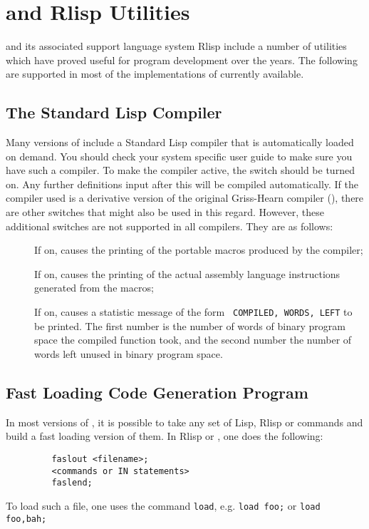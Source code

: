 \chapter{{\REDUCE} and Rlisp Utilities}

{\REDUCE} and its associated support language system Rlisp
include a number of utilities which have proved useful for program
development over the years.  The following are supported in most of the
implementations of {\REDUCE} currently available.

\section{The Standard Lisp Compiler}
\hypertarget{switch:COMP}{}

Many versions of {\REDUCE} include a Standard Lisp compiler that is
automatically loaded on demand.  You should check your system specific
user guide to make sure you have such a compiler.  To make the compiler
active, the switch  should be turned on.  Any
further definitions input after this will be compiled automatically.  If
the compiler used is a derivative version of the original Griss-Hearn
compiler (\cite{Griss:79}),
there are other switches that might also be
used in this regard.  However, these additional switches are not supported
in all compilers.  They are as follows:
\begin{description}
\item[] If on, causes the printing of the
portable macros produced by the compiler; 
%
\item[]  If on, causes the printing of the
actual assembly language instructions generated from the macros; 
%
\item[] If on, causes a statistic
message of the form \newline
\texttt{ COMPILED,  WORDS,  LEFT} \newline
to be printed.  The first number is the number of words of binary
program space the compiled function took, and the second number
the number of words left unused in binary program space. 
\end{description}

\section{Fast Loading Code Generation Program}
\label{sec-load}
\hypertarget{command:LOAD}{}
\hypertarget{command:LOAD_PACKAGE}{}
In most versions of {\REDUCE}, it is possible to take any set of Lisp, Rlisp
or {\REDUCE} commands and build a fast loading version of them. In Rlisp or
{\REDUCE}, one does the following:
\begin{verbatim}
         faslout <filename>;
         <commands or IN statements>
         faslend;
\end{verbatim}
To load such a file, one uses the command \texttt{load},
e.g. \texttt{load foo;}
or \texttt{load foo,bah;}

